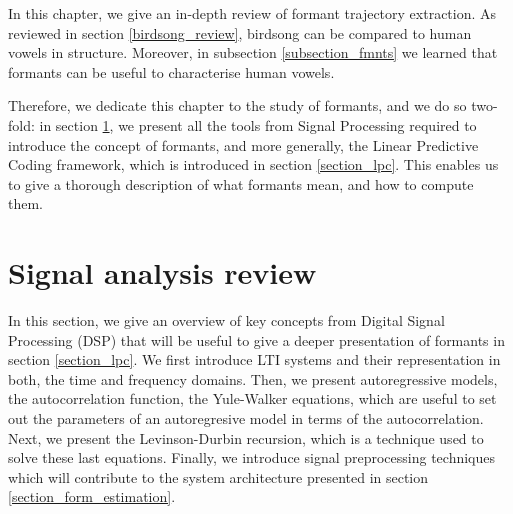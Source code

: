 \documentclass[../main.tex]{subfiles}
\begin{document}
 \label{chapter_formants}
\par In this chapter, we give an in-depth review of formant trajectory extraction. As reviewed in section \ref{birdsong_review}, birdsong can be compared to human vowels in structure. Moreover, in subsection \ref{subsection_fmnts} we learned that formants can be useful to characterise human vowels.  
\par Therefore, we dedicate this chapter to the study of formants, and we do so two-fold: in section \ref{section_dsp}, we present all the tools from Signal Processing required to introduce the concept of formants, and more generally, the Linear Predictive Coding framework, which is introduced in section \ref{section_lpc}. This enables us to give a thorough description of what formants mean, and how to compute them.

\section{Signal analysis review} \label{section_dsp}
In this section, we give an overview of key concepts from Digital Signal Processing (DSP) that will be useful to give a deeper presentation of formants in section \ref{section_lpc}. We first introduce LTI systems and their representation in both, the time and frequency domains. Then, we present autoregressive models, the autocorrelation function, the Yule-Walker equations, which are useful to set out the parameters of an autoregresive model in terms of the autocorrelation. Next, we present the Levinson-Durbin recursion, which is a technique used to solve these last equations. Finally, we introduce signal preprocessing techniques which will contribute to the system architecture presented in section \ref{section_form_estimation}. 
\end{document}
